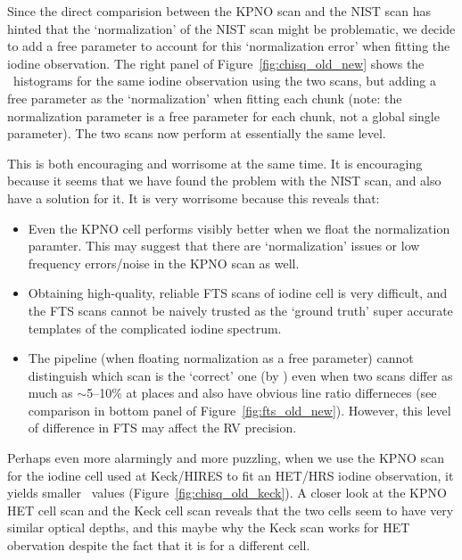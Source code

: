 Since the direct comparision between the KPNO scan and the NIST scan
has hinted that the `normalization' of the NIST scan might be
problematic, we decide to add a free parameter to account for this
`normalization error' when fitting the iodine observation. The right
panel of Figure~\ref{fig:chisq_old_new} shows the \chisq\ histograms
for the same iodine observation using the two scans, but adding a free
parameter as the `normalization' when fitting each chunk (note: the
normalization parameter is a free parameter for each chunk, not a
global single parameter). The two scans now perform at essentially the
same level.

This is both encouraging and worrisome at the same time. It is
encouraging because it seems that we have found the problem with the
NIST scan, and also have a solution for it. It is very worrisome
because this reveals that:
\begin{itemize}
  \item Even the KPNO cell performs visibly better when we float the
    normalization paramter. This may suggest that there are
    `normalization' issues or low frequency errors/noise in the KPNO
    scan as well.
  \item Obtaining high-quality, reliable FTS scans of iodine cell is
    very difficult, and the FTS scans cannot be naively trusted as the
    `ground truth' super accurate templates of the complicated iodine
    spectrum.
  \item The pipeline (when floating normalization as a free parameter)
    cannot distinguish which scan is the `correct' one (by \chisq)
    even when two scans differ as much as $\sim$5--10\% at places and
    also have obvious line ratio differneces (see comparison in bottom
    panel of Figure~\ref{fig:fts_old_new}). However, this level of
    difference in FTS may affect the RV precision.
\end{itemize}  

Perhaps even more alarmingly and more puzzling, when we use the KPNO
scan for the iodine cell used at Keck/HIRES to fit an HET/HRS iodine
observation, it yields smaller \chisq\ values
(Figure~\ref{fig:chisq_old_keck}). A closer look at the KPNO HET cell
scan and the Keck cell scan reveals that the two cells seem to have
very similar optical depths, and this maybe why the Keck scan works
for HET obervation despite the fact that it is for a different cell.


